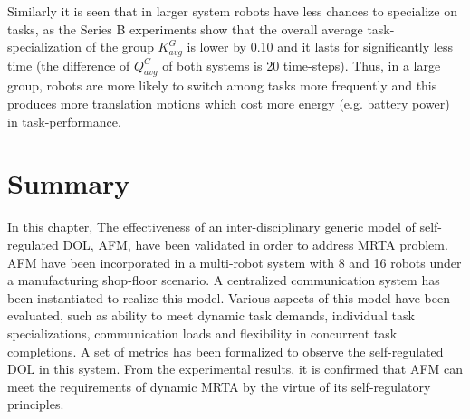 Similarly it is seen that in larger system robots have less chances to specialize on tasks, as the Series B experiments show  that the overall average task-specialization of the group $K^G_{avg}$ is lower by 0.10 and it lasts for significantly less time (the difference of $Q^G_{avg}$  of both systems is 20 time-steps). Thus, in a large group, robots are more likely to switch among tasks more frequently and this produces more translation motions which cost more energy (e.g. battery power) in task-performance.
\vspace*{1cm}
\section{Summary}
\label{afm:summary}
In this chapter,  The effectiveness of an inter-disciplinary generic model of self-regulated DOL, AFM, have been validated in order to address MRTA problem. AFM have been incorporated  in a multi-robot system with 8 and 16 robots under a manufacturing shop-floor scenario. A centralized communication system has been instantiated to realize this model.  Various aspects of this model have been evaluated, such as ability to meet dynamic task demands, individual task specializations, communication loads and flexibility in concurrent task completions. A set of metrics has been formalized to observe the self-regulated DOL in this system. From the experimental results,  it is confirmed that AFM can meet the requirements of dynamic MRTA by the virtue of its self-regulatory principles.